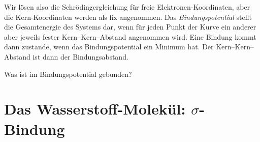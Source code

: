 Wir lösen also die Schrödingergleichung für freie Elektronen-Koordinaten, aber die Kern-Koordinaten werden als fix angenommen. Das \emph{Bindungspotential} stellt die Gesamtenergie des Systems dar, wenn für jeden Punkt der Kurve ein anderer aber jeweils fester Kern--Kern--Abstand angenommen wird. Eine Bindung kommt dann zustande, wenn das Bindungspotential ein Minimum hat. Der Kern--Kern--Abstand ist dann der Bindungsabstand.

\begin{questions} 
\item Was ist im Bindungspotential gebunden?
\end{questions}

\section{Das Wasserstoff-Molekül: $\sigma$-Bindung}


